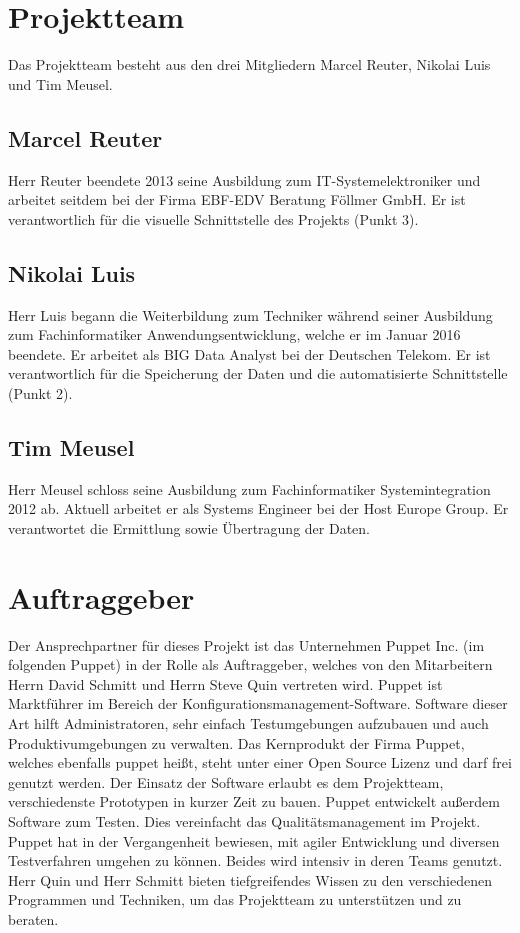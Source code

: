 \section{Projektteam}
Das Projektteam besteht aus den drei Mitgliedern Marcel Reuter, Nikolai Luis
und Tim Meusel.
\all%

\subsection{Marcel Reuter}
Herr Reuter beendete 2013 seine Ausbildung zum IT\hyp{}Systemelektroniker und
arbeitet seitdem bei der Firma EBF\hyp{}EDV Beratung Föllmer GmbH. Er ist
verantwortlich für die visuelle Schnittstelle des Projekts (Punkt 3).
\mr%

\subsection{Nikolai Luis}
Herr Luis begann die Weiterbildung zum Techniker während seiner Ausbildung zum
Fachinformatiker Anwendungsentwicklung, welche er im Januar 2016 beendete. Er
arbeitet als BIG Data Analyst bei der Deutschen Telekom. Er ist verantwortlich
für die Speicherung der Daten und die automatisierte Schnittstelle (Punkt 2).
\nl%

\subsection{Tim Meusel}
Herr Meusel schloss seine Ausbildung zum Fachinformatiker Systemintegration
2012 ab. Aktuell arbeitet er als Systems Engineer bei der Host Europe Group.
Er verantwortet die Ermittlung sowie Übertragung der Daten.
\tm%

\section{Auftraggeber}
Der Ansprechpartner für dieses Projekt ist das Unternehmen Puppet Inc. (im
folgenden Puppet) in der Rolle als Auftraggeber, welches von den Mitarbeitern
Herrn David Schmitt und Herrn Steve Quin vertreten wird. Puppet ist Marktführer
im Bereich der Konfigurationsmanagement\hyp{}Software. Software dieser Art
hilft Administratoren, sehr einfach Testumgebungen aufzubauen und auch
Produktivumgebungen zu verwalten. Das Kernprodukt der Firma Puppet, welches
ebenfalls puppet heißt, steht unter einer Open Source Lizenz und darf frei
genutzt werden. Der Einsatz der Software erlaubt es dem Projektteam,
verschiedenste Prototypen in kurzer Zeit zu bauen. Puppet entwickelt außerdem
Software zum Testen. Dies vereinfacht das Qualitätsmanagement im Projekt.
Puppet hat in der Vergangenheit bewiesen, mit agiler Entwicklung und diversen
Testverfahren umgehen zu können. Beides wird intensiv in deren Teams genutzt.
Herr Quin und Herr Schmitt bieten tiefgreifendes Wissen zu den verschiedenen
Programmen und Techniken, um das Projektteam zu unterstützen und zu beraten.
\all%

